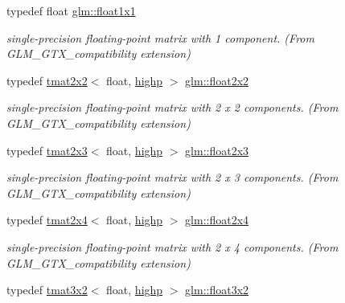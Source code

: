 \begin{DoxyCompactItemize}
typedef float \mbox{\hyperlink{group__gtx__compatibility_gaac1faa940ac1fbb32d4a315005b578af}{glm\+::float1x1}}
\begin{DoxyCompactList}\small\item\em single-\/precision floating-\/point matrix with 1 component. (From G\+L\+M\+\_\+\+G\+T\+X\+\_\+compatibility extension) \end{DoxyCompactList}\item 
typedef \mbox{\hyperlink{structglm_1_1tmat2x2}{tmat2x2}}$<$ float, \mbox{\hyperlink{namespaceglm_a0f04f086094c747d227af4425893f545ac6f7eab42eacbb10d59a58e95e362074}{highp}} $>$ \mbox{\hyperlink{group__gtx__compatibility_ga577dc885086d068647175794909bc026}{glm\+::float2x2}}
\begin{DoxyCompactList}\small\item\em single-\/precision floating-\/point matrix with 2 x 2 components. (From G\+L\+M\+\_\+\+G\+T\+X\+\_\+compatibility extension) \end{DoxyCompactList}\item 
typedef \mbox{\hyperlink{structglm_1_1tmat2x3}{tmat2x3}}$<$ float, \mbox{\hyperlink{namespaceglm_a0f04f086094c747d227af4425893f545ac6f7eab42eacbb10d59a58e95e362074}{highp}} $>$ \mbox{\hyperlink{group__gtx__compatibility_gad4078adf5ec44d1878c63bf2962fbe9e}{glm\+::float2x3}}
\begin{DoxyCompactList}\small\item\em single-\/precision floating-\/point matrix with 2 x 3 components. (From G\+L\+M\+\_\+\+G\+T\+X\+\_\+compatibility extension) \end{DoxyCompactList}\item 
typedef \mbox{\hyperlink{structglm_1_1tmat2x4}{tmat2x4}}$<$ float, \mbox{\hyperlink{namespaceglm_a0f04f086094c747d227af4425893f545ac6f7eab42eacbb10d59a58e95e362074}{highp}} $>$ \mbox{\hyperlink{group__gtx__compatibility_ga33955674c7eee16728dd45fc10dc9547}{glm\+::float2x4}}
\begin{DoxyCompactList}\small\item\em single-\/precision floating-\/point matrix with 2 x 4 components. (From G\+L\+M\+\_\+\+G\+T\+X\+\_\+compatibility extension) \end{DoxyCompactList}\item 
typedef \mbox{\hyperlink{structglm_1_1tmat3x2}{tmat3x2}}$<$ float, \mbox{\hyperlink{namespaceglm_a0f04f086094c747d227af4425893f545ac6f7eab42eacbb10d59a58e95e362074}{highp}} $>$ \mbox{\hyperlink{group__gtx__compatibility_ga2d2b535c9bad9274456ae12676bc6865}{glm\+::float3x2}}

\end{DoxyCompactItemize}
